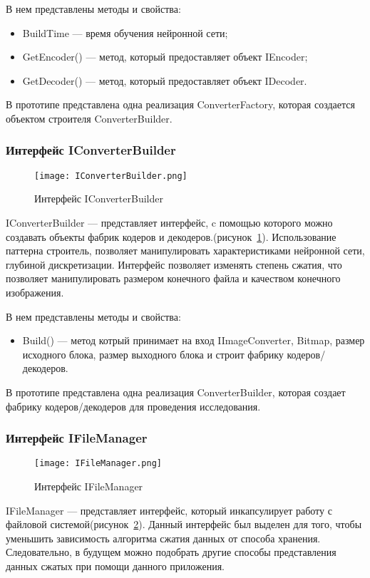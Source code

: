 В нем представлены методы и свойства:
\begin{itemize}
  \item BuildTime --- время обучения нейронной сети;
  \item GetEncoder() --- метод, который предоставляет объект IEncoder;
  \item GetDecoder() --- метод, который предоставляет объект IDecoder.
\end{itemize}

В прототипе представлена одна реализация ConverterFactory, которая создается объектом строителя ConverterBuilder.

\subsubsection{Интерфейс IConverterBuilder}
\label{subsub:development:types:iconverterbuilder}

\begin{figure}[ht]
\centering
  \texttt{[image: IConverterBuilder.png]}
  \caption{ Интерфейс IConverterBuilder }
  \label{fig:iconverterbuilder}
\end{figure}
IConverterBuilder --- представляет интерфейс, c помощью которого можно создавать объекты фабрик кодеров и декодеров.(рисунок~\ref{fig:iconverterbuilder}).
Использование паттерна строитель, позволяет манипулировать характеристиками нейронной сети, глубиной дискретизации.
Интерфейс позволяет изменять степень сжатия, что позволяет манипулировать размером конечного файла и качеством конечного изображения.

В нем представлены методы и свойства:
\begin{itemize}
  \item Build() --- метод котрый принимает на вход IImageConverter, Bitmap, размер исходного блока,
  размер выходного блока и строит фабрику кодеров/декодеров.
\end{itemize}

В прототипе представлена одна реализация ConverterBuilder, которая создает фабрику кодеров/декодеров для проведения исследования.

\subsubsection{Интерфейс IFileManager}
\label{subsub:development:types:ifilemanager}

\begin{figure}[ht]
\centering
  \texttt{[image: IFileManager.png]}
  \caption{ Интерфейс IFileManager }
  \label{fig:ifilemanager}
\end{figure}
IFileManager --- представляет интерфейс, который инкапсулирует работу с файловой системой(рисунок~\ref{fig:ifilemanager}).
Данный интерфейс был выделен для того, чтобы уменьшить зависимость алгоритма сжатия данных от способа хранения.
Следовательно, в будущем можно подобрать другие способы представления данных сжатых при помощи данного приложения.

